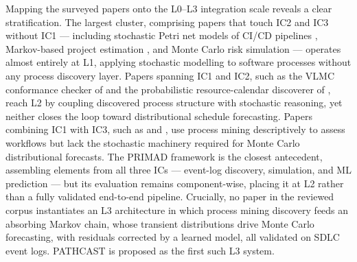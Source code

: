 Mapping the surveyed papers onto the L0–L3 integration scale reveals a clear stratification. The largest cluster, comprising papers that touch IC2 and IC3 without IC1 — including stochastic Petri net models of CI/CD pipelines \cite{bhadra2022,bhadra2023}, Markov-based project estimation \cite{massitela2018,tyagi2021}, and Monte Carlo risk simulation \cite{lunesu2021,magennis2015} — operates almost entirely at L1, applying stochastic modelling to software processes without any process discovery layer. Papers spanning IC1 and IC2, such as the VLMC conformance checker of \cite{incerto2025} and the probabilistic resource-calendar discoverer of \cite{lopezpintado2023}, reach L2 by coupling discovered process structure with stochastic reasoning, yet neither closes the loop toward distributional schedule forecasting. Papers combining IC1 with IC3, such as \cite{salmani2022} and \cite{caldeira2022}, use process mining descriptively to assess workflows but lack the stochastic machinery required for Monte Carlo distributional forecasts. The PRIMAD framework \cite{guinea2025} is the closest antecedent, assembling elements from all three ICs — event-log discovery, simulation, and ML prediction — but its evaluation remains component-wise, placing it at L2 rather than a fully validated end-to-end pipeline. Crucially, no paper in the reviewed corpus instantiates an L3 architecture in which process mining discovery feeds an absorbing Markov chain, whose transient distributions drive Monte Carlo forecasting, with residuals corrected by a learned model, all validated on SDLC event logs. PATHCAST is proposed as the first such L3 system.

